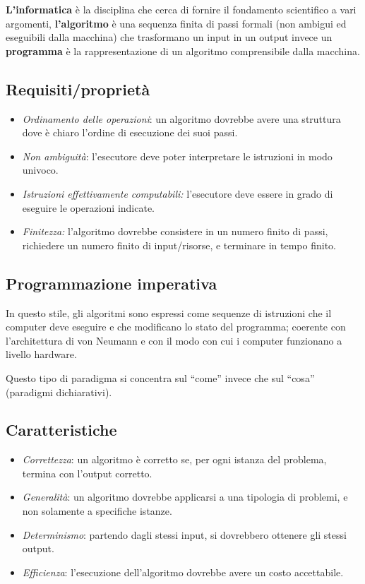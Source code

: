 \textbf{L'informatica} è la disciplina che cerca di fornire il
fondamento scientifico a vari argomenti, \textbf{l'algoritmo} è una
sequenza finita di passi formali (non ambigui ed eseguibili dalla
macchina) che trasformano un input in un output invece un
\textbf{programma} è la rappresentazione di un algoritmo comprensibile
dalla macchina.

\subsection{\texorpdfstring{
Requisiti/proprietà}{ Requisiti/proprietà}}\label{requisitiproprietuxe0}

\begin{itemize}
\item
  \emph{Ordinamento delle operazioni}: un algoritmo dovrebbe avere una
  struttura dove è chiaro l'ordine di esecuzione dei suoi passi.
\item
  \emph{Non ambiguità}: l'esecutore deve poter interpretare le
  istruzioni in modo univoco.
\item
  \emph{Istruzioni effettivamente computabili:} l'esecutore deve essere
  in grado di eseguire le operazioni indicate.
\item
  \emph{Finitezza:} l'algoritmo dovrebbe consistere in un numero finito
  di passi, richiedere un numero finito di input/risorse, e terminare in
  tempo finito.
\end{itemize}

\subsection{Programmazione imperativa}\label{programmazione-imperativa}

In questo stile, gli algoritmi sono espressi come sequenze di istruzioni
che il computer deve eseguire e che modificano lo stato del programma;
coerente con l'architettura di von Neumann e con il modo con cui i
computer funzionano a livello hardware.

Questo tipo di paradigma si concentra sul ``come'' invece che sul
``cosa'' (paradigmi dichiarativi).

\subsection{Caratteristiche}\label{caratteristiche}

\begin{itemize}
\item
  \emph{Correttezza}: un algoritmo è corretto se, per ogni istanza del
  problema, termina con l'output corretto.
\item
  \emph{Generalità}: un algoritmo dovrebbe applicarsi a una tipologia di
  problemi, e non solamente a specifiche istanze.
\item
  \emph{Determinismo}: partendo dagli stessi input, si dovrebbero
  ottenere gli stessi output.
\item
  \emph{Efficienza}: l'esecuzione dell'algoritmo dovrebbe avere un costo
  accettabile.
\end{itemize}

